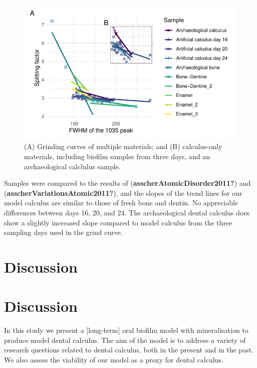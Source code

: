 \documentclass[
]{article}
\begin{document}
\begin{figure}

{\centering \includegraphics{figures/fig-grind-curve-inset-1.pdf}

}

\caption{\label{fig-grind-curve-inset}(A) Grinding curves of multiple
materials; and (B) calculus-only materials, including biofilm samples
from three days, and an archaeological calclulus sample.}

\end{figure}

Samples were compared to the results of
(\textbf{asscherAtomicDisorder2011?}) and
(\textbf{asscherVariationsAtomic2011?}), and the slopes of the trend
lines for our model calculus are similar to those of fresh bone and
dentin. No appreciable differences between days 16, 20, and 24. The
archaeological dental calculus does show a slightly increased slope
compared to model calculus from the three sampling days used in the
grind curve.

\hypertarget{discussion}{%
\section{Discussion}\label{discussion}}

\hypertarget{discussion-1}{%
\section{Discussion}\label{discussion-1}}

In this study we present a {[}long-term{]} oral biofilm model with
mineralisation to produce model dental calculus. The aim of the model is
to address a variety of research questions related to dental calculus,
both in the present and in the past. We also assess the viability of our
model as a proxy for dental calculus.
\end{document}
